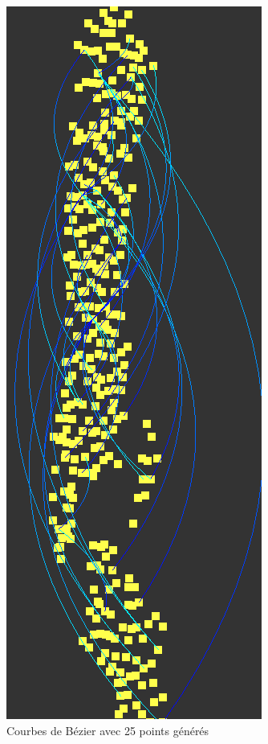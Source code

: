 \documentclass[12pt]{article}
\begin{document}
		\begin{figure}[!h]
		\begin{center}
		\includegraphics[scale=.60]{25_generated_points.png}
		\caption{Courbes de Bézier avec 25 points générés}
		\end{center}
		\end{figure}
		\clearpage
				
		
\end{document}
